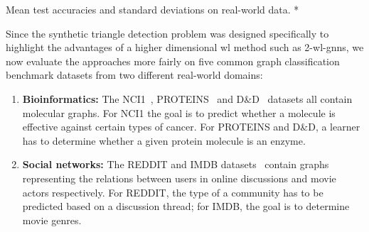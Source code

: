 \begin{table}[ht]
	\caption[Mean test accuracies and standard deviations on real-world data.]{
		Mean test accuracies and standard deviations on real-world data.
		\hfill\textcolor{t_darkgreen}{*}\,
	}\label{tbl:eval:real}
	\centering
\end{table}
Since the synthetic triangle detection problem was designed specifically to highlight the advantages of a higher dimensional \ac{wl} method such as 2-\ac{wl}-\acsp{gnn}, we now evaluate the approaches more fairly on five common graph classification benchmark datasets from two different real-world domains:
\begin{enumerate}[label={\textbf{\arabic*.}}]
	\item \textbf{Bioinformatics:}
		The NCI1~\cite{Shervashidze2011}, PROTEINS~\cite{Borgwardt2005a} and D\&D~\cite{Dobson2003} datasets all contain molecular graphs.
		For NCI1 the goal is to predict whether a molecule is effective against certain types of cancer.
		For PROTEINS and D\&D, a learner has to determine whether a given protein molecule is an enzyme.
	\item \textbf{Social networks:}
		The REDDIT and IMDB datasets~\cite{Yanardag2015} contain graphs representing the relations between users in online discussions and movie actors respectively.
		For REDDIT, the type of a community has to be predicted based on a discussion thread; for IMDB, the goal is to determine movie genres.
\end{enumerate}
